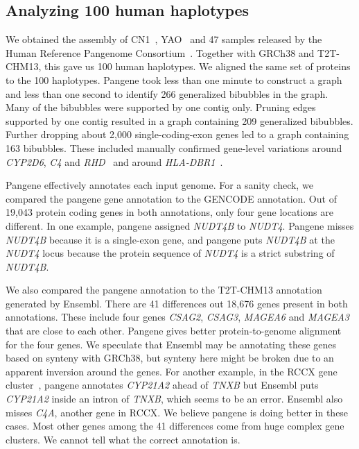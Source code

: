 \documentclass[webpdf,contemporary,large,namedate]{oup-authoring-template}%
\begin{document}
\subsection{Analyzing 100 human haplotypes}

We obtained the assembly of CN1~\citep{Yang:2023aa}, YAO~\citep{He:2023aa} and 47 samples released by the Human Reference Pangenome Consortium~\citep{Liao:2023aa}.
Together with GRCh38 and T2T-CHM13, this gave us 100 human haplotypes.
We aligned the same set of proteins to the 100 haplotypes.
Pangene took less than one minute to construct a graph
and less than one second to identify 266 generalized bibubbles in the graph.
Many of the bibubbles were supported by one contig only.
Pruning edges supported by one contig resulted in a graph containing 209 generalized bibubbles.
Further dropping about 2,000 single-coding-exon genes led to a graph containing 163 bibubbles.
These included manually confirmed gene-level variations around {\it CYP2D6}, {\it C4} and
{\it RHD}~\citep{Liao:2023aa} and around {\it HLA-DBR1}~\citep{Zhou2024.01.20.576452}.

Pangene effectively annotates each input genome.
For a sanity check, we compared the pangene gene annotation to the GENCODE annotation.
Out of 19,043 protein coding genes in both annotations,
only four gene locations are different.
In one example, pangene assigned \emph{NUDT4B} to \emph{NUDT4}.
Pangene misses \emph{NUDT4B} because it is a single-exon gene,
and pangene puts \emph{NUDT4B} at the \emph{NUDT4} locus
because the protein sequence of \emph{NUDT4} is a strict substring of \emph{NUDT4B}.

We also compared the pangene annotation to the T2T-CHM13 annotation generated by Ensembl.
There are 41 differences out 18,676 genes present in both annotations.
These include four genes \emph{CSAG2}, \emph{CSAG3}, \emph{MAGEA6} and \emph{MAGEA3} that are close to each other.
Pangene gives better protein-to-genome alignment for the four genes.
We speculate that Ensembl may be annotating these genes based on synteny with GRCh38,
but synteny here might be broken due to an apparent inversion around the genes.
For another example, in the RCCX gene cluster~\citep{Carrozza:2021aa}, pangene annotates \emph{CYP21A2} ahead of \emph{TNXB}
but Ensembl puts \emph{CYP21A2} inside an intron of \emph{TNXB}, which seems to be an error.
Ensembl also misses \emph{C4A}, another gene in RCCX.
We believe pangene is doing better in these cases.
Most other genes among the 41 differences come from huge complex gene clusters.
We cannot tell what the correct annotation is.
\end{document}
